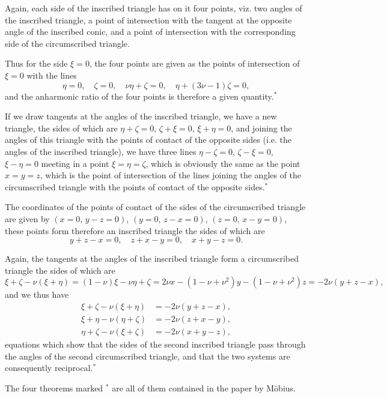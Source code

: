\documentclass[11pt,a4paper]{article}
\theoremstyle{plain}
\begin{document}
Again, each side of the inscribed triangle has on it four points, viz. two angles of the inscribed triangle, a point of intersection with the tangent at the opposite angle of the inscribed conic, and a point of intersection with the corresponding side of the circumscribed triangle.

Thus for the side $\xi = 0$, the four points are given as the points of intersection of $\xi = 0$ with the lines
\[
\eta = 0,\quad \zeta = 0,\quad \nu\eta + \zeta = 0,\quad \eta + (3\nu - 1)\zeta = 0,
\]
and the anharmonic ratio of the four points is therefore a given quantity.$^*$

If we draw tangents at the angles of the inscribed triangle, we have a new triangle, the sides of which are $\eta + \zeta = 0$, $\zeta + \xi = 0$, $\xi + \eta = 0$, and joining the angles of this triangle with the points of contact of the opposite sides (i.e. the angles of the inscribed triangle), we have three lines $\eta - \zeta = 0$, $\zeta - \xi = 0$, $\xi - \eta = 0$ meeting in a point $\xi = \eta = \zeta$, which is obviously the same as the point $x = y = z$, which is the point of intersection of the lines joining the angles of the circumscribed triangle with the points of contact of the opposite sides.$^*$

The coordinates of the points of contact of the sides of the circumscribed triangle are given by $(x = 0,\, y - z = 0)$, $(y = 0,\, z - x = 0)$, $(z = 0,\, x - y = 0)$, these points form therefore an inscribed triangle the sides of which are
\[
y + z - x = 0,\quad z + x - y = 0,\quad x + y - z = 0.
\]

Again, the tangents at the angles of the inscribed triangle form a circumscribed triangle the sides of which are
\[
\xi + \zeta - \nu(\xi + \eta) = (1 - \nu)\xi - \nu\eta + \zeta = 2\nu x - (1 - \nu + \nu^2)y - (1 - \nu + \nu^2)z = -2\nu(y + z - x),
\]
and we thus have
\begin{align*}
\xi + \zeta - \nu(\xi + \eta) &= -2\nu(y + z - x),\\
\xi + \eta - \nu(\eta + \zeta) &= -2\nu(z + x - y),\\
\eta + \zeta - \nu(\xi + \zeta) &= -2\nu(x + y - z),
\end{align*}
equations which show that the sides of the second inscribed triangle pass through the angles of the second circumscribed triangle, and that the two systems are consequently reciprocal.$^*$

The four theorems marked $^*$ are all of them contained in the paper by M\"{o}bius.
\end{document}
